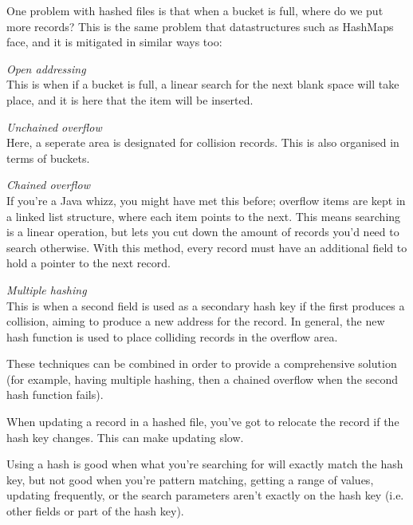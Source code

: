 \begin{description}
    One problem with hashed files is that when a bucket is full, where do we put
    more records? This is the same problem that datastructures such as HashMaps
    face, and it is mitigated in similar ways too:

    \begin{description}
      \item \textit{Open addressing}\\
        This is when if a bucket is full, a linear search for the next blank
        space will take place, and it is here that the item will be inserted.

      \item \textit{Unchained overflow}\\
        Here, a seperate area is designated for collision records. This is also
        organised in terms of buckets.

      \item \textit{Chained overflow}\\
        If you're a Java whizz, you might have met this before; overflow items
        are kept in a linked list structure, where each item points to the next.
        This means searching is a linear operation, but lets you cut down the
        amount of records you'd need to search otherwise. With this method,
        every record must have an additional field to hold a pointer to the next
        record.

      \item \textit{Multiple hashing}\\
        This is when a second field is used as a secondary hash key if the first
        produces a collision, aiming to produce a new address for the record. In
        general, the new hash function is used to place colliding records in the
        overflow area.
    \end{description}

    These techniques can be combined in order to provide a comprehensive
    solution (for example, having multiple hashing, then a chained overflow when
    the second hash function fails).

    When updating a record in a hashed file, you've got to relocate the record
    if the hash key changes. This can make updating slow.

    Using a hash is good when what you're searching for will exactly match the
    hash key, but not good when you're pattern matching, getting a range of
    values, updating frequently, or the search parameters aren't exactly on the
    hash key (i.e. other fields or part of the hash key).

\end{description}

